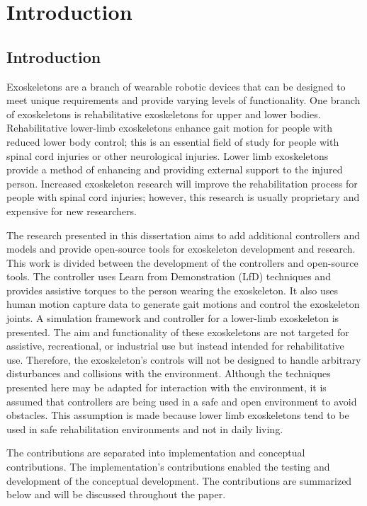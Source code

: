 \chapter{Introduction}
\section{Introduction}
Exoskeletons are a branch of wearable robotic devices that can be designed to meet unique requirements and provide varying levels of functionality. One branch of exoskeletons is rehabilitative exoskeletons for upper and lower bodies. Rehabilitative lower-limb exoskeletons enhance gait motion for people with reduced lower body control; this is an essential field of study for people with spinal cord injuries or other neurological injuries. Lower limb exoskeletons provide a method of enhancing and providing external support to the injured person. Increased exoskeleton research will improve the rehabilitation process for people with spinal cord injuries; however, this research is usually proprietary and expensive for new researchers.

The research presented in this dissertation aims to add additional controllers and models and provide open-source tools for exoskeleton development and research. This work is divided between the development of the controllers and open-source tools. The controller uses Learn from Demonstration (LfD) techniques and provides assistive torques to the person wearing the exoskeleton. It also uses human motion capture data to generate gait motions and control the exoskeleton joints. A simulation framework and controller for a lower-limb exoskeleton is presented. The aim and functionality of these exoskeletons are not targeted for assistive, recreational, or industrial use but instead intended for rehabilitative use. Therefore, the exoskeleton's controls will not be designed to handle arbitrary disturbances and collisions with the environment. Although the techniques presented here may be adapted for interaction with the environment, it is assumed that controllers are being used in a safe and open environment to avoid obstacles. This assumption is made because lower limb exoskeletons tend to be used in safe rehabilitation environments and not in daily living.

The contributions are separated into implementation and conceptual contributions. The implementation's contributions enabled the testing and development of the conceptual development. The contributions are summarized below and will be discussed throughout the paper. 

